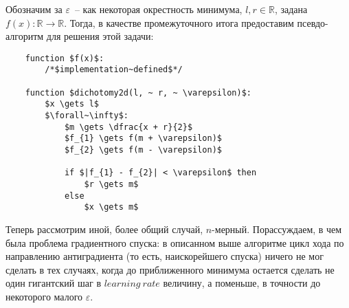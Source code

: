 \documentclass[12pt, a4paper, oneside]{article}
\begin{document}
	Обозначим за $\varepsilon$~-- как некоторая окрестность минимума, $l, r \in \mathbb{R}$, задана $f(x) : \mathbb{R} \to \mathbb{R}$. Тогда, в качестве промежуточного итога предоставим псевдо-алгоритм для решения этой задачи:
	\begin{lstlisting}
	function $f(x)$:
		/*$implementation~defined$*/

	function $dichotomy2d(l, ~ r, ~ \varepsilon)$:
		$x \gets l$
		$\forall~\infty$:
			$m \gets \dfrac{x + r}{2}$
			$f_{1} \gets f(m + \varepsilon)$
			$f_{2} \gets f(m - \varepsilon)$

			if $|f_{1} - f_{2}| < \varepsilon$ then
				$r \gets m$
			else
				$x \gets m$
	\end{lstlisting}
	Теперь рассмотрим иной, более общий случай, $n$-мерный. Порассуждаем, в чем была проблема градиентного спуска: в описанном выше алгоритме цикл хода по направлению антиградиента (то есть, наискорейшего спуска) ничего не мог сделать в тех случаях, когда до приближенного минимума остается сделать не один гигантский шаг в $learning~rate$ величину, а поменьше, в точности до некоторого малого $\varepsilon$.
\end{document}
